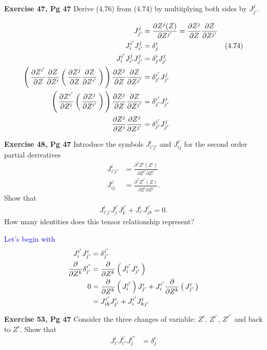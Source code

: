 \documentclass[12pt,a4paper]{report}
\newcommand{\BLUE}[1]{\textcolor{blue}{#1}}
\begin{document}
\begin{description}
	\item \textbf{Exercise 47, Pg 47} Derive (4.76) from (4.74) by multiiplying both sides by $J_{j'}^j$.
	
	\BLUE{
	\begin{align*}
		J_{j'}^j &= \frac{\partial Z^{j}(Z)}{\partial Z^{j'}} = \frac{\partial Z^j}{\partial Z}\frac{\partial Z}{\partial Z^{j'}}\\
		J_i^{i'}J_{i'}^j&= \delta^{i}_{j} & (4.74) \\
		J_i^{i'}J_{i'}^jJ_{j'}^j &= \delta^{i}_{j}J_{j'}^j \\
		\left (\, \frac{\partial Z^{i'}}{\partial Z}\frac{\partial Z}{\partial Z^i}\left (\, \frac{\partial Z^j}{\partial Z}\frac{\partial Z}{\partial Z^{i'}} \,\right ) \,\right )\frac{\partial Z^j}{\partial Z}\frac{\partial Z}{\partial Z^{j'}} &= \delta^{i'}_{j'}J_{j'}^j \\
		\left (\, \frac{\partial Z^{i'}}{\partial Z^i}\left (\, \frac{\partial Z^j}{\partial Z^{i'}} \,\right ) \,\right )\frac{\partial Z^j}{\partial Z}\frac{\partial Z}{\partial Z^{j'}} &= \delta^{i'}_{j'}J_{j'}^j \\
		\frac{\partial Z^j}{\partial Z^i}\frac{\partial Z^j}{\partial Z^{j'}} &= \delta^{i'}_{j'}J_{j'}^j
	\end{align*}
	}
	
	\item \textbf{Exercise 48, Pg 47} Introduce the symbols $J_{i'j'}^i$ and $J_{ij}^{i'}$ for the second order partial derivatives
	\begin{align*}
		J_{i'j'}^i &= \frac{\partial^2 Z^i(Z')}{\partial Z^{i'}\partial Z^{j'}}\\
		J_{ij}^{i'} &= \frac{\partial^2 Z^{i'}(Z)}{\partial Z^{i}\partial Z^{j}}.
	\end{align*}Show that
	\begin{align*}
		J_{i'j'}^iJ_j^{i'}J_k^{j'}+J_{i'}^iJ_{jk}^{i'}=0.
\end{align*}	 How many identities does this tensor relationship represent?
	
	\BLUE{Let's begin with 
	\begin{align*}
		J_i^{i'}J_{j'}^i &=\delta_{j'}^{i'} \\
		\frac{\partial}{\partial Z^k}\delta_{j'}^{i'} &=\frac{\partial}{\partial Z^k}\left (\, J_i^{i'}J_{j'}^i \,\right ) \\
		0 &= \frac{\partial}{\partial Z^k}\left (\, J_i^{i'} \,\right )J_{j'}^i + J_i^{i'}\frac{\partial}{\partial Z^k}\left (\, J_{j'}^i \,\right )\\
		&= J_{ik}^{i'}J_{j'}^i+J_i^{i'}J_{kj'}^i
	\end{align*}
	}
	
	\newcommand{\JJJ}[2]{J^{#1}_{#2}}
	\newcommand{\JJJJ}[2]{\frac{\partial Z^{#1}(Z)}{\partial Z^{#2}}}
	\item \textbf{Exercise 53, Pg 47} Consider the three changes of variable: $Z^i$, $Z^{i'}$, $Z^{i''}$ and back to $Z^i$.  Show that
	\begin{align*}
		\JJJ{i}{i'}\JJJ{i'}{i''}\JJJ{i''}{j}	&= \delta^i_j
	\end{align*}
	

\end{description}
\end{document}
